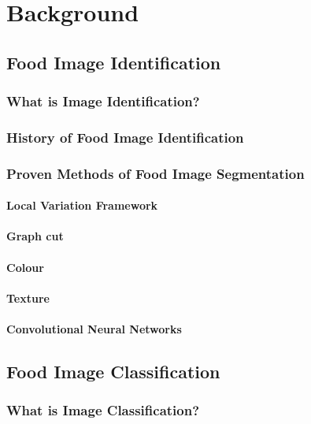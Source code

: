 \chapter{Background}
\label{background}

\section{Food Image Identification}

\subsection{What is Image Identification?}

\subsection{History of Food Image Identification}

\subsection{Proven Methods of Food Image Segmentation}
\subsubsection{Local Variation Framework}
\subsubsection{Graph cut}
\subsubsection{Colour}
\subsubsection{Texture}
\subsubsection{Convolutional Neural Networks}


\section{Food Image Classification}
\subsection{What is Image Classification?}

